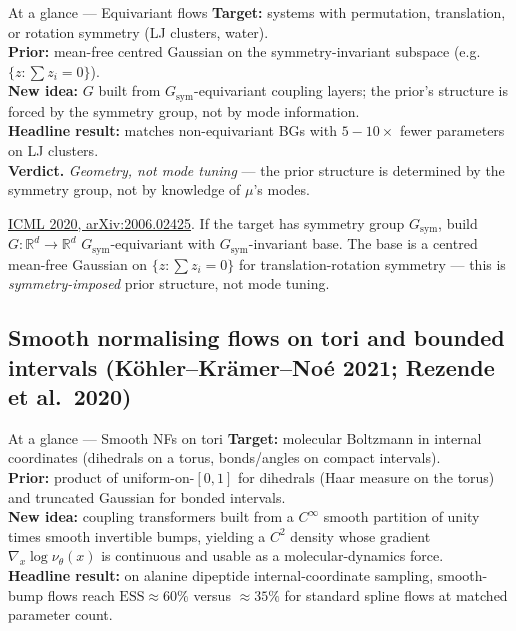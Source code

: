 \documentclass[11pt,letterpaper]{article}
\newcommand{\Real}{\mathbb{R}}
\newcommand{\ESS}{\mathrm{ESS}}
\theoremstyle{plain}
\begin{document}
\begin{methodbox}{At a glance --- Equivariant flows}
\textbf{Target:} systems with permutation, translation, or rotation symmetry (LJ clusters, water).\\
\textbf{Prior:} mean-free centred Gaussian on the symmetry-invariant subspace (e.g.\ $\{z:\sum z_i=0\}$).\\
\textbf{New idea:} $G$ built from $G_{\mathrm{sym}}$-equivariant coupling layers; the prior's structure is forced by the symmetry group, not by mode information.\\
\textbf{Headline result:} matches non-equivariant BGs with $5{-}10\times$ fewer parameters on LJ clusters.\\
\textbf{Verdict.} \emph{Geometry, not mode tuning} --- the prior structure is determined by the symmetry group, not by knowledge of $\mu$'s modes.
\end{methodbox}

\href{https://arxiv.org/abs/2006.02425}{ICML 2020, arXiv:2006.02425}. If the target
has symmetry group $G_{\mathrm{sym}}$, build $G:\Real^d\to\Real^d$
$G_{\mathrm{sym}}$-equivariant with $G_{\mathrm{sym}}$-invariant base. The base is
a centred mean-free Gaussian on $\{z:\sum z_i=0\}$ for translation-rotation symmetry
--- this is \emph{symmetry-imposed} prior structure, not mode tuning.

\subsection{Smooth normalising flows on tori and bounded intervals (Köhler--Krämer--Noé 2021; Rezende et al.\ 2020)}\label{sec:smoothNF}

\begin{methodbox}{At a glance --- Smooth NFs on tori}
\textbf{Target:} molecular Boltzmann in internal coordinates (dihedrals on a torus, bonds/angles on compact intervals).\\
\textbf{Prior:} product of uniform-on-$[0,1]$ for dihedrals (Haar measure on the torus) and truncated Gaussian for bonded intervals.\\
\textbf{New idea:} coupling transformers built from a $C^\infty$ smooth partition of unity times smooth invertible bumps, yielding a $C^2$ density whose gradient $\nabla_x\log\nu_\theta(x)$ is continuous and usable as a molecular-dynamics force.\\
\textbf{Headline result:} on alanine dipeptide internal-coordinate sampling, smooth-bump flows reach $\ESS\approx 60\%$ versus $\approx 35\%$ for standard spline flows at matched parameter count.
\end{methodbox}
\end{document}

